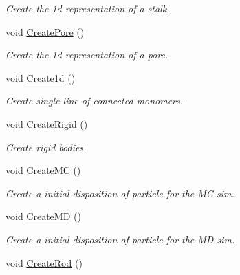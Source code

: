 \begin{DoxyCompactItemize}
\begin{DoxyCompactList}\small\item\em \-Create the 1d representation of a stalk. \end{DoxyCompactList}\item 
\hypertarget{classForces_a20cdf4594381226c7b142df535f41893}{void \hyperlink{classForces_a20cdf4594381226c7b142df535f41893}{\-Create\-Pore} ()}\label{classForces_a20cdf4594381226c7b142df535f41893}

\begin{DoxyCompactList}\small\item\em \-Create the 1d representation of a pore. \end{DoxyCompactList}\item 
\hypertarget{classForces_a150658611a20b7185df56cc52412bc3f}{void \hyperlink{classForces_a150658611a20b7185df56cc52412bc3f}{\-Create1d} ()}\label{classForces_a150658611a20b7185df56cc52412bc3f}

\begin{DoxyCompactList}\small\item\em \-Create single line of connected monomers. \end{DoxyCompactList}\item 
\hypertarget{classForces_a655ba1e4004f501b750638d781f45c82}{void \hyperlink{classForces_a655ba1e4004f501b750638d781f45c82}{\-Create\-Rigid} ()}\label{classForces_a655ba1e4004f501b750638d781f45c82}

\begin{DoxyCompactList}\small\item\em \-Create rigid bodies. \end{DoxyCompactList}\item 
\hypertarget{classForces_a3f01e349d6a138fb20f9caa406c0d561}{void \hyperlink{classForces_a3f01e349d6a138fb20f9caa406c0d561}{\-Create\-M\-C} ()}\label{classForces_a3f01e349d6a138fb20f9caa406c0d561}

\begin{DoxyCompactList}\small\item\em \-Create a initial disposition of particle for the \-M\-C sim. \end{DoxyCompactList}\item 
\hypertarget{classForces_a344629f905b1cbbcb311a4d3e6ff8818}{void \hyperlink{classForces_a344629f905b1cbbcb311a4d3e6ff8818}{\-Create\-M\-D} ()}\label{classForces_a344629f905b1cbbcb311a4d3e6ff8818}

\begin{DoxyCompactList}\small\item\em \-Create a initial disposition of particle for the \-M\-D sim. \end{DoxyCompactList}\item 
\hypertarget{classForces_ae3378b62462d086cb39724e03074fb97}{void \hyperlink{classForces_ae3378b62462d086cb39724e03074fb97}{\-Create\-Rod} ()}\label{classForces_ae3378b62462d086cb39724e03074fb97}


\end{DoxyCompactItemize}
